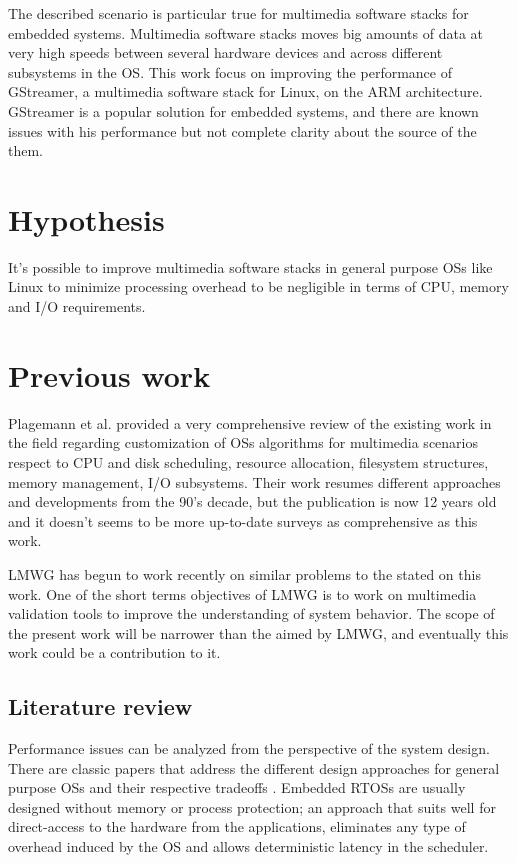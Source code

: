 The described scenario is particular true for multimedia software stacks for embedded systems. Multimedia software stacks moves big amounts of data at very high speeds between several hardware devices and across different subsystems in the \ac{OS}. This work focus on improving the performance of GStreamer, a multimedia software stack for Linux, on the \ac{ARM} architecture. GStreamer is a popular solution for embedded systems, and there are known issues with his performance but not complete clarity about the source of the them\cite{Contreras:vn}.

\section{Hypothesis}
It's possible to improve multimedia software stacks in general purpose \aclp{OS} like Linux to minimize processing overhead to be negligible in terms of CPU, memory and I/O requirements.

\section{Previous work}
Plagemann et al.\cite{Plagemann2000267} provided a very comprehensive review of the existing work in the field regarding customization of \acp{OS} algorithms for multimedia scenarios respect to CPU and disk scheduling, resource allocation, filesystem structures, memory management, I/O subsystems. Their work resumes different approaches and developments from the 90's decade, but the publication is now 12 years old and it doesn't seems to be more up-to-date surveys as comprehensive as this work.

\ac{LMWG} has begun to work recently on similar problems\cite{Reis:vn} to the stated on this work. One of the short terms objectives of \ac{LMWG} is to work on multimedia validation tools to improve the understanding of system behavior. The scope of the present work will be narrower than the aimed by \ac{LMWG}, and eventually this work could be a contribution to it.

\subsection{Literature review}
Performance issues can be analyzed from the perspective of the system design. There are classic papers that address the different design approaches for general purpose \aclp{OS} and their respective tradeoffs \cite{Engler95exokernel:an}\cite{Bershad95extensibility}\citep{Liedtke:1995kx}. Embedded \acp{RTOS} are usually designed without memory or process protection; an approach that suits well for direct-access to the hardware from the applications, eliminates any type of overhead induced by the \ac{OS} and allows deterministic latency in the scheduler.

